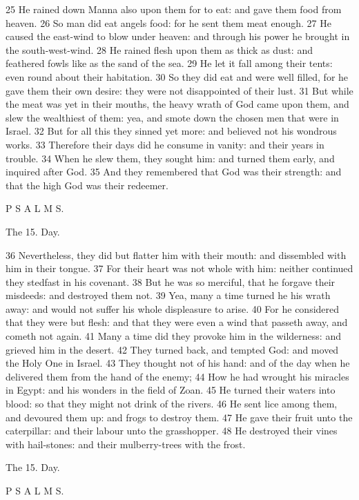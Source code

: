 25 He rained down Manna also upon them for to eat: and gave them food from heaven. 26 So man did eat angels food: for he sent them meat enough. 27 He caused the east-wind to blow under heaven: and through his power he brought in the south-west-wind. 28 He rained flesh upon them as thick as dust: and feathered fowls like as the sand of the sea. 29 He let it fall among their tents: even round about their habitation. 30 So they did eat and were well filled, for he gave them their own desire: they were not disappointed of their lust. 31 But while the meat was yet in their mouths, the heavy wrath of God came upon them, and slew the wealthiest of them: yea, and smote down the chosen men that were in Israel. 32 But for all this they sinned yet more: and believed not his wondrous works. 33 Therefore their days did he consume in vanity: and their years in trouble. 34 When he slew them, they sought him: and turned them early, and inquired after God. 35 And they remembered that God was their strength: and that the high God was their redeemer.

P S A L M S.

The 15. Day.

36 Nevertheless, they did but flatter him with their mouth: and dissembled with him in their tongue. 37 For their heart was not whole with him: neither continued they stedfast in his covenant. 38 But he was so merciful, that he forgave their misdeeds: and destroyed them not. 39 Yea, many a time turned he his wrath away: and would not suffer his whole displeasure to arise. 40 For he considered that they were but flesh: and that they were even a wind that passeth away, and cometh not again. 41 Many a time did they provoke him in the wilderness: and grieved him in the desert. 42 They turned back, and tempted God: and moved the Holy One in Israel. 43 They thought not of his hand: and of the day when he delivered them from the hand of the enemy; 44 How he had wrought his miracles in Egypt: and his wonders in the field of Zoan. 45 He turned their waters into blood: so that they might not drink of the rivers. 46 He sent lice among them, and devoured them up: and frogs to destroy them. 47 He gave their fruit unto the caterpillar: and their labour unto the grasshopper. 48 He destroyed their vines with hail-stones: and their mulberry-trees with the frost.

The 15. Day.

P S A L M S.

